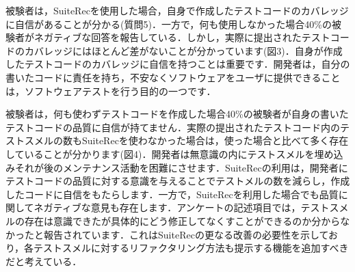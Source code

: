 \documentclass[conference]{IEEEtran}
\begin{document}
被験者は，SuiteRecを使用した場合，自身で作成したテストコードのカバレッジに自信があることが分かる(質問5)．一方で，何も使用しなかった場合40\%の被験者がネガティブな回答を報告している．しかし，実際に提出されたテストコードのカバレッジにはほとんど差がないことが分かっています(図3)．自身が作成したテストコードのカバレッジに自信を持つことは重要です．開発者は，自分の書いたコードに責任を持ち，不安なくソフトウェアをユーザに提供できることは，ソフトウェアテストを行う目的の一つです．

被験者は，何も使わずテストコードを作成した場合40\%の被験者が自身の書いたテストコードの品質に自信が持てません．実際の提出されたテストコード内のテストスメルの数もSuiteRecを使わなかった場合は，使った場合と比べて多く存在していることが分かります(図4)．開発者は無意識の内にテストスメルを埋め込みそれが後のメンテナンス活動を困難にさせます．SuiteRecの利用は，開発者にテストコードの品質に対する意識を与えることでテストメルの数を減らし，作成したコードに自信をもたらします．一方で，SuiteRecを利用した場合でも品質に関してネガティブな意見も存在します．アンケートの記述項目では，テストスメルの存在は意識できたが具体的にどう修正してなくすことができるのか分からなかったと報告されています．これはSuiteRecの更なる改善の必要性を示しており，各テストスメルに対するリファクタリング方法も提示する機能を追加すべきだと考えている．
\end{document}

